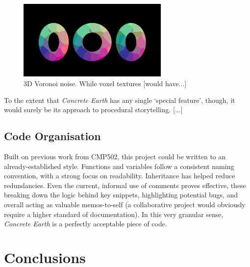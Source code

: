 \documentclass[a4paper, 11pt]{article}
\begin{document}
\begin{flushleft}
\vspace{5pt}\noindent
\begin{figure}[h]
\centering
\includegraphics[width=0.66\textwidth]{Euclidean Voronoi Voxel}
\caption{3D Voronoi noise. While voxel textures [would have...]}
\label{Euclidean Voronoi Voxel}
\end{figure}

\vspace{5pt}\noindent
To the extent that \textit{Concrete Earth} has any single `special feature', though, it would surely be its approach to procedural storytelling. [...]

\subsection{Code Organisation}

Built on previous work from CMP502, this project could be written to an already-established style. Functions and variables follow a consistent naming convention, with a strong focus on readability. Inheritance has helped reduce redundancies. Even the current, informal use of comments proves effective, these breaking down the logic behind key snippets, highlighting potential bugs, and overall acting as valuable memos-to-self (a collaborative project would obviously require a higher standard of documentation). In this very granular sense, \textit{Concrete Earth} is a perfectly acceptable piece of code.

\vspace{5pt}

\vspace{5pt}

\vspace{5pt}

\section{Conclusions}


\end{flushleft}
\end{document}
